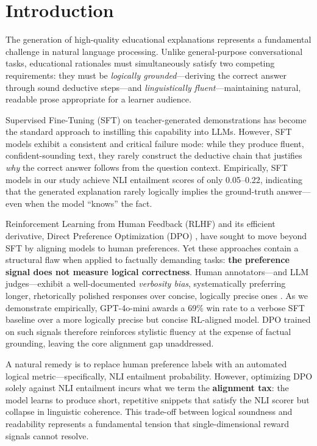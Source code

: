 \section{Introduction}

The generation of high-quality educational explanations represents a fundamental challenge in natural language processing. Unlike general-purpose conversational tasks, educational rationales must simultaneously satisfy two competing requirements: they must be \textit{logically grounded}---deriving the correct answer through sound deductive steps---and \textit{linguistically fluent}---maintaining natural, readable prose appropriate for a learner audience.

Supervised Fine-Tuning (SFT) on teacher-generated demonstrations has become the standard approach to instilling this capability into LLMs. However, SFT models exhibit a consistent and critical failure mode: while they produce fluent, confident-sounding text, they rarely construct the deductive chain that justifies \textit{why} the correct answer follows from the question context. Empirically, SFT models in our study achieve NLI entailment scores of only 0.05--0.22, indicating that the generated explanation rarely logically implies the ground-truth answer---even when the model ``knows'' the fact.

Reinforcement Learning from Human Feedback (RLHF) and its efficient derivative, Direct Preference Optimization (DPO) \cite{rafailov2023direct}, have sought to move beyond SFT by aligning models to human preferences. Yet these approaches contain a structural flaw when applied to factually demanding tasks: \textbf{the preference signal does not measure logical correctness}. Human annotators---and LLM judges---exhibit a well-documented \textit{verbosity bias}, systematically preferring longer, rhetorically polished responses over concise, logically precise ones \cite{zheng2024judging}. As we demonstrate empirically, GPT-4o-mini awards a 69\% win rate to a verbose SFT baseline over a more logically precise but concise RL-aligned model. DPO trained on such signals therefore reinforces stylistic fluency at the expense of factual grounding, leaving the core alignment gap unaddressed.

A natural remedy is to replace human preference labels with an automated logical metric---specifically, NLI entailment probability. However, optimizing DPO solely against NLI entailment incurs what we term the \textbf{alignment tax}: the model learns to produce short, repetitive snippets that satisfy the NLI scorer but collapse in linguistic coherence. This trade-off between logical soundness and readability represents a fundamental tension that single-dimensional reward signals cannot resolve.

